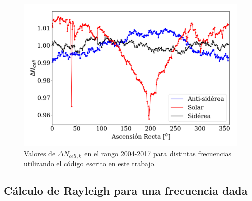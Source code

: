        \begin{figure}[H]
          \centering
              \includegraphics[width=0.8\linewidth]{weigths_2020.png}
              \caption{Valores de $\Delta N_{cell, k}$ en el rango 2004-2017 para distintas frecuencias utilizando el código escrito en este trabajo.}
              \label{fig:pesos_ejemplo}
        \end{figure}



  \subsection{Cálculo de Rayleigh para una frecuencia dada} \label{rayleigh}

